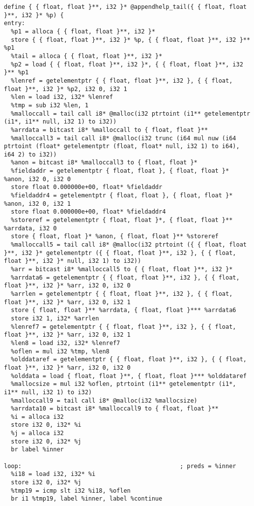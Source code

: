 \documentclass[main.tex]{subfiles}
\begin{document}
{\begin{lstlisting}
define { { float, float }**, i32 }* @appendhelp_tail({ { float, float }**, i32 }* %p) {
entry:
  %p1 = alloca { { float, float }**, i32 }*
  store { { float, float }**, i32 }* %p, { { float, float }**, i32 }** %p1
  %tail = alloca { { float, float }**, i32 }*
  %p2 = load { { float, float }**, i32 }*, { { float, float }**, i32 }** %p1
  %lenref = getelementptr { { float, float }**, i32 }, { { float, float }**, i32 }* %p2, i32 0, i32 1
  %len = load i32, i32* %lenref
  %tmp = sub i32 %len, 1
  %malloccall = tail call i8* @malloc(i32 ptrtoint (i1** getelementptr (i1*, i1** null, i32 1) to i32))
  %arrdata = bitcast i8* %malloccall to { float, float }**
  %malloccall3 = tail call i8* @malloc(i32 trunc (i64 mul nuw (i64 ptrtoint (float* getelementptr (float, float* null, i32 1) to i64), i64 2) to i32))
  %anon = bitcast i8* %malloccall3 to { float, float }*
  %fieldaddr = getelementptr { float, float }, { float, float }* %anon, i32 0, i32 0
  store float 0.000000e+00, float* %fieldaddr
  %fieldaddr4 = getelementptr { float, float }, { float, float }* %anon, i32 0, i32 1
  store float 0.000000e+00, float* %fieldaddr4
  %storeref = getelementptr { float, float }*, { float, float }** %arrdata, i32 0
  store { float, float }* %anon, { float, float }** %storeref
  %malloccall5 = tail call i8* @malloc(i32 ptrtoint ({ { float, float }**, i32 }* getelementptr ({ { float, float }**, i32 }, { { float, float }**, i32 }* null, i32 1) to i32))
  %arr = bitcast i8* %malloccall5 to { { float, float }**, i32 }*
  %arrdata6 = getelementptr { { float, float }**, i32 }, { { float, float }**, i32 }* %arr, i32 0, i32 0
  %arrlen = getelementptr { { float, float }**, i32 }, { { float, float }**, i32 }* %arr, i32 0, i32 1
  store { float, float }** %arrdata, { float, float }*** %arrdata6
  store i32 1, i32* %arrlen
  %lenref7 = getelementptr { { float, float }**, i32 }, { { float, float }**, i32 }* %arr, i32 0, i32 1
  %len8 = load i32, i32* %lenref7
  %oflen = mul i32 %tmp, %len8
  %olddataref = getelementptr { { float, float }**, i32 }, { { float, float }**, i32 }* %arr, i32 0, i32 0
  %olddata = load { float, float }**, { float, float }*** %olddataref
  %mallocsize = mul i32 %oflen, ptrtoint (i1** getelementptr (i1*, i1** null, i32 1) to i32)
  %malloccall9 = tail call i8* @malloc(i32 %mallocsize)
  %arrdata10 = bitcast i8* %malloccall9 to { float, float }**
  %i = alloca i32
  store i32 0, i32* %i
  %j = alloca i32
  store i32 0, i32* %j
  br label %inner

loop:                                             ; preds = %inner
  %i18 = load i32, i32* %i
  store i32 0, i32* %j
  %tmp19 = icmp slt i32 %i18, %oflen
  br i1 %tmp19, label %inner, label %continue


\end{lstlisting}}
\end{document}
